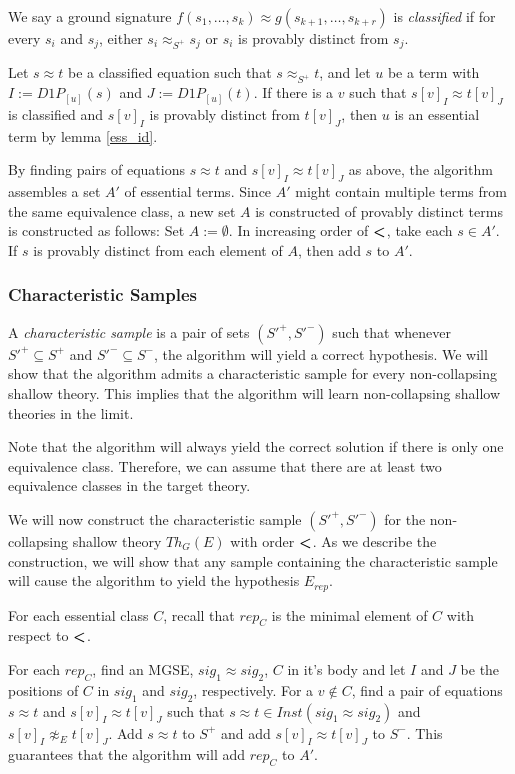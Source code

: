 We say a ground signature $f(s_1,\dots,s_k) \approx g(s_{k+1},\dots,s_{k+r})$ is \emph{classified} if for every $s_i$ and $s_j$, either $s_i \approx_{S^+} s_j$ or $s_i$ is provably distinct from $s_j$. 


Let $s \approx t$ be a classified equation such that $s \approx_{S^+} t$, and let $u$ be a term with $I := D1P_{[u]}(s)$ and $J := D1P_{[u]}(t)$.
If there is a $v$ such that $s[v]_I \approx t[v]_J$ is classified and $s[v]_I$ is provably distinct from $t[v]_J$, then $u$ is an essential term by lemma \ref{ess_id}. 

By finding pairs of equations $s \approx t$ and $s[v]_I \approx t[v]_J$ as above, the algorithm assembles a set $A'$ of essential terms.
Since $A'$ might contain multiple terms from the same equivalence class, a new set $A$ is constructed of provably distinct terms is constructed as follows:
Set $A := \emptyset$. 
In increasing order of $\textbf{\textless}$, take each $s \in A'$. 
If $s$ is provably distinct from each element of $A$, then add $s$ to $A'$.


\subsubsection{Characteristic Samples}

A \emph{characteristic sample} is a pair of sets $(S'^{+}, S'^{-})$ such that whenever $S'^{+} \subseteq S^+$ and $S'^{-} \subseteq S^-$, the algorithm will yield a correct hypothesis.
We will show that the algorithm admits a characteristic sample for every non-collapsing shallow theory.
This implies that the algorithm will learn non-collapsing shallow theories in the limit. 

Note that the algorithm will always yield the correct solution if there is only one equivalence class.%
Therefore, we can assume that there are at least two equivalence classes in the target theory.

We will now construct the characteristic sample $(S'^{+}, S'^{-})$ for the non-collapsing shallow theory $Th_G(E)$ with order $\textbf{\textless}$.
As we describe the construction, we will show that any sample containing the characteristic sample will cause the algorithm to yield the hypothesis $E_{rep}$.

For each essential class $C$, recall that $rep_C$ is the minimal element of $C$ with respect to $\textbf{\textless}$. 

For each $rep_C$, find an MGSE, $sig_1 \approx sig_2$, $C$ in it's body and let $I$ and $J$ be the positions of $C$ in $sig_1$ and $sig_2$, respectively. 
For a $v \not\in C$, find a pair of equations $s \approx t$ and $s[v]_I \approx t[v]_J$ such that $s \approx t \in Inst(sig_1 \approx sig_2)$ and $s[v]_I \not\approx_E t[v]_J$.
Add $s \approx t$ to $S^+$ and add $s[v]_I \approx t[v]_J$ to $S^-$.
This guarantees that the algorithm will add $rep_C$ to $A'$.

